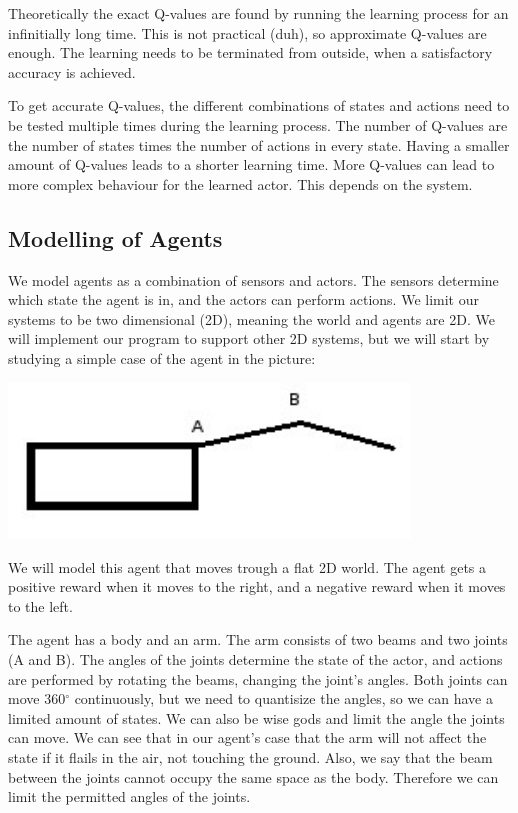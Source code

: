 \documentclass{article}
\begin{document}
Theoretically the exact Q-values are found by running the learning process
for an infinitially long time. This is not practical (duh), so approximate
Q-values are enough. The learning needs to be terminated from outside, when a
satisfactory accuracy is achieved.

To get accurate Q-values, the different combinations of states and actions
need to be tested multiple times during the learning process.
The number of Q-values are the number of states times the number of actions
in every state. Having a smaller amount of Q-values leads to a shorter learning
time. More Q-values can lead to more complex behaviour for the learned actor.
This depends on the system.


\subsection{Modelling of Agents}
We model agents as a combination of sensors and actors. The sensors determine
which state the agent is in, and the actors can perform actions.
We limit our systems to be two dimensional (2D), meaning the world and agents
are 2D. We will implement our program to support other 2D systems, but we
will start by studying a simple case of the agent in the picture:

\includegraphics[width=0.8\textwidth]{simple_agent}

We will model this agent that moves trough a flat 2D world.
The agent gets a positive reward when it moves to the right, and a negative
reward when it moves to the left.

The agent has a body and an arm. The arm consists of two beams and two joints
(A and B). The angles of the joints determine the state of the actor, and
actions are performed by rotating the beams, changing the joint's angles.
Both joints can move 360$^\circ$ continuously, but we need to quantisize
the angles, so we can have a limited amount of states. We can also be wise
gods and limit the angle the joints can move. We can see that in our agent's
case that the arm will not affect the state if it flails in the air, not
touching the ground. Also, we say that the beam between the joints cannot
occupy the same space as the body. Therefore we can limit the permitted angles
of the joints.
\end{document}
